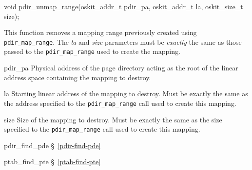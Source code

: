 \label{pdir-unmap-range}
\begin{apisyn}

	\funcproto void pdir_unmap_range(oskit_addr_t pdir_pa, oskit_addr_t la,
					 oskit_size_t size);
\end{apisyn}
\begin{apidesc}
	This function removes a mapping range
	previously created using {\tt pdir_map_range}.
	The \emph{la} and \emph{size} parameters
	must be \emph{exactly} the same as those passed
	to the {\tt pdir_map_range} used to create the mapping.
\end{apidesc}
\begin{apiparm}
	\item[pdir_pa]
		Physical address of the page directory
		acting as the root of the linear address space
		containing the mapping to destroy.
	\item[la]
		Starting linear address of the mapping to destroy.
		Must be exactly the same as the address
		specified to the {\tt pdir_map_range} call
		used to create this mapping.
	\item[size]
		Size of the mapping to destroy.
		Must be exactly the same as the size
		specified to the {\tt pdir_map_range} call
		used to create this mapping.
\end{apiparm}
\begin{apidep}
	\item[pdir_find_pde]	\S~\ref{pdir-find-pde}
	\item[ptab_find_pte]	\S~\ref{ptab-find-pte}
\end{apidep}

